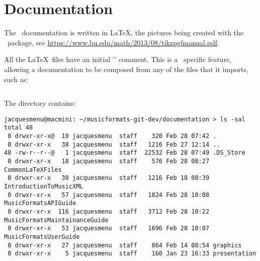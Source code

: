 



\chapter{Documentation}

The \mf\ documentation is written in \LaTeX, the pictures being created with the \tikzpgf\ package, see \url{https://www.bu.edu/math/2013/08/tikzpgfmanual.pdf}.

All the \LaTeX\ files have an initial '' comment. This is a \texshop\ specific feature, allowing a documentation to be composed from any of the files that it imports, such as:
\begin{lstlisting}[language=Latex]
% !TEX root = MusicFormatsMaintainanceGuide.tex
\end{lstlisting}

The  directory contains:
\begin{lstlisting}[language=Terminal]
jacquesmenu@macmini: ~/musicformats-git-dev/documentation > ls -sal
total 48
 0 drwxr-xr-x@  10 jacquesmenu  staff    320 Feb 28 07:42 .
 0 drwxr-xr-x   38 jacquesmenu  staff   1216 Feb 27 12:14 ..
48 -rw-r--r--@   1 jacquesmenu  staff  22532 Feb 28 07:49 .DS_Store
 0 drwxr-xr-x   18 jacquesmenu  staff    576 Feb 28 08:27 CommonLaTeXFiles
 0 drwxr-xr-x   38 jacquesmenu  staff   1216 Feb 18 08:39 IntroductionToMusicXML
 0 drwxr-xr-x   57 jacquesmenu  staff   1824 Feb 28 10:08 MusicFormatsAPIGuide
 0 drwxr-xr-x  116 jacquesmenu  staff   3712 Feb 28 10:22 MusicFormatsMaintainanceGuide
 0 drwxr-xr-x   53 jacquesmenu  staff   1696 Feb 28 10:07 MusicFormatsUserGuide
 0 drwxr-xr-x   27 jacquesmenu  staff    864 Feb 14 08:54 graphics
 0 drwxr-xr-x    5 jacquesmenu  staff    160 Jan 23 16:33 presentation
\end{lstlisting}

